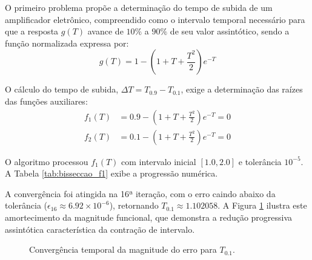 O primeiro problema \cite{franco_calculo_2007} propõe a determinação do tempo de subida de um amplificador eletrônico, compreendido como o intervalo temporal necessário para que a resposta $g(T)$ avance de $10\%$ a $90\%$ de seu valor assintótico, sendo a função normalizada expressa por:
\begin{equation}
    g(T) = 1 - \left(1 + T + \frac{T^2}{2}\right)e^{-T}
\end{equation}

O cálculo do tempo de subida, $\Delta T = T_{0.9} - T_{0.1}$, exige a determinação das raízes das funções auxiliares:
\begin{align}
    f_1(T) &= 0.9 - \left(1 + T + \frac{T^2}{2}\right)e^{-T} = 0 \label{eq:f1_bisseccao} \\
    f_2(T) &= 0.1 - \left(1 + T + \frac{T^2}{2}\right)e^{-T} = 0 \label{eq:f2_bisseccao}
\end{align}



O algoritmo processou $f_1(T)$ com intervalo inicial $[1.0, 2.0]$ e tolerância $10^{-5}$. A Tabela \ref{tab:bisseccao_f1} exibe a progressão numérica.

A convergência foi atingida na 16ª iteração, com o erro caindo abaixo da tolerância ($\epsilon_{16} \approx 6.92 \times 10^{-6}$), retornando $T_{0.1} \approx 1.102058$. A Figura \ref{fig:grafico_bisseccao_csv} ilustra este amortecimento da magnitude funcional, que demonstra a redução progressiva assintótica característica da contração de intervalo.

\begin{figure}[H]
    \centering
    \caption{Convergência temporal da magnitude do erro para $T_{0.1}$.}
    \label{fig:grafico_bisseccao_csv}
\end{figure}

